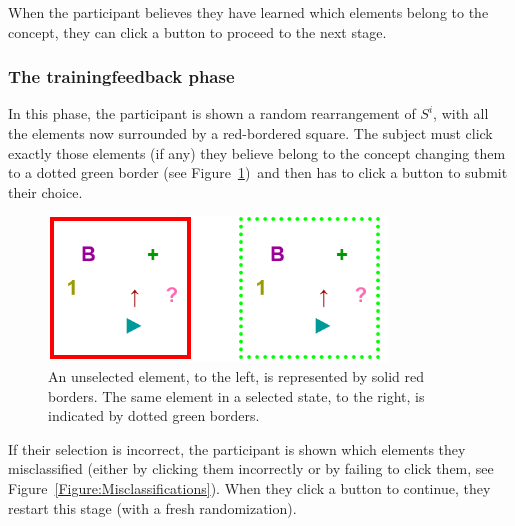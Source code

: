When the participant believes they have learned which elements belong to the concept, they can click a button to proceed to the next stage.

\subsubsection{The training\textendash feedback phase}\label{Subsection:training}

In this phase, the participant is shown a random rearrangement of $S^i$, with all the elements now surrounded by a red-bordered square. The subject must click exactly those elements (if any) they believe belong to the concept \textemdash changing them to a dotted green border (see Figure~\ref{Figure:ElementSquares})\textemdash\ and then has to click a button to submit their choice.

\begin{figure}[h!] 
\begin{center}
    	\includegraphics[scale=0.6]{papers/images_behavior_research_methods/SelectionSeparadosIguales.png}
	\caption{An unselected element, to the left, is represented by solid red borders. The same element in a selected state, to the right, is indicated by dotted green borders.}
	\label{Figure:ElementSquares}
\end{center}
\end{figure}

If their selection  is  incorrect, the participant is shown which elements they misclassified (either by clicking them incorrectly or by failing to click them, see Figure~\ref{Figure:Misclassifications}). When they click a button to continue, they restart this stage (with a fresh randomization).

